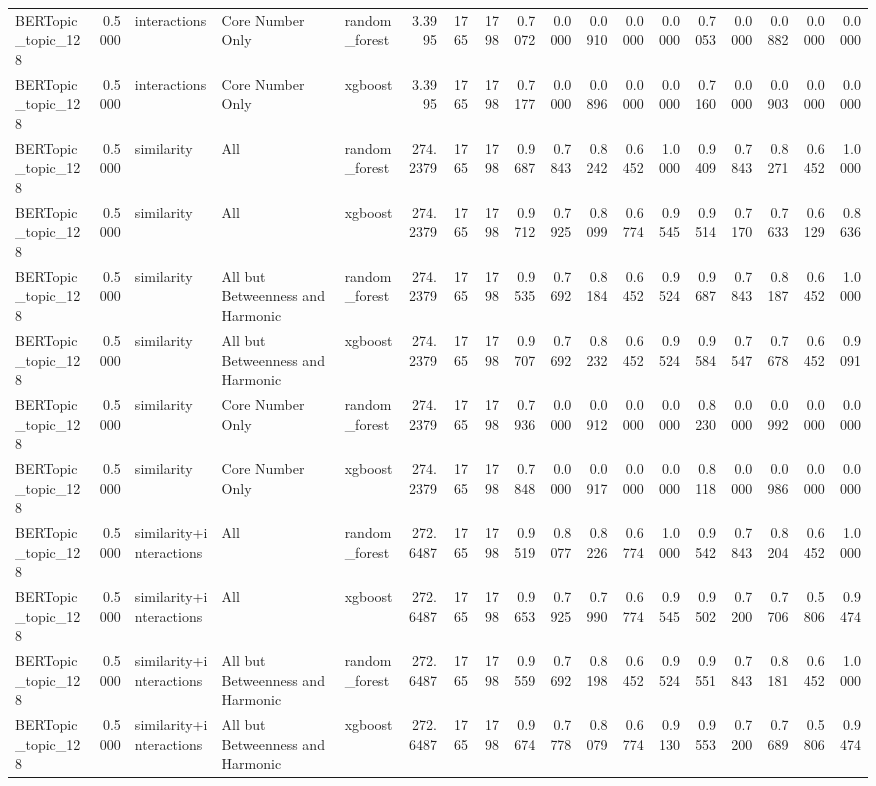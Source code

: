 \begin{tabular}{lrlllrrrrrrrrrrrrr}
BERTopic_topic_128 & 0.5000 & interactions & Core Number Only & random_forest & 3.3995 & 1765 & 1798 & 0.7072 & 0.0000 & 0.0910 & 0.0000 & 0.0000 & 0.7053 & 0.0000 & 0.0882 & 0.0000 & 0.0000 \\
BERTopic_topic_128 & 0.5000 & interactions & Core Number Only & xgboost & 3.3995 & 1765 & 1798 & 0.7177 & 0.0000 & 0.0896 & 0.0000 & 0.0000 & 0.7160 & 0.0000 & 0.0903 & 0.0000 & 0.0000 \\
BERTopic_topic_128 & 0.5000 & similarity & All & random_forest & 274.2379 & 1765 & 1798 & 0.9687 & 0.7843 & 0.8242 & 0.6452 & 1.0000 & 0.9409 & 0.7843 & 0.8271 & 0.6452 & 1.0000 \\
BERTopic_topic_128 & 0.5000 & similarity & All & xgboost & 274.2379 & 1765 & 1798 & 0.9712 & 0.7925 & 0.8099 & 0.6774 & 0.9545 & 0.9514 & 0.7170 & 0.7633 & 0.6129 & 0.8636 \\
BERTopic_topic_128 & 0.5000 & similarity & All but Betweenness and Harmonic & random_forest & 274.2379 & 1765 & 1798 & 0.9535 & 0.7692 & 0.8184 & 0.6452 & 0.9524 & 0.9687 & 0.7843 & 0.8187 & 0.6452 & 1.0000 \\
BERTopic_topic_128 & 0.5000 & similarity & All but Betweenness and Harmonic & xgboost & 274.2379 & 1765 & 1798 & 0.9707 & 0.7692 & 0.8232 & 0.6452 & 0.9524 & 0.9584 & 0.7547 & 0.7678 & 0.6452 & 0.9091 \\
BERTopic_topic_128 & 0.5000 & similarity & Core Number Only & random_forest & 274.2379 & 1765 & 1798 & 0.7936 & 0.0000 & 0.0912 & 0.0000 & 0.0000 & 0.8230 & 0.0000 & 0.0992 & 0.0000 & 0.0000 \\
BERTopic_topic_128 & 0.5000 & similarity & Core Number Only & xgboost & 274.2379 & 1765 & 1798 & 0.7848 & 0.0000 & 0.0917 & 0.0000 & 0.0000 & 0.8118 & 0.0000 & 0.0986 & 0.0000 & 0.0000 \\
BERTopic_topic_128 & 0.5000 & similarity+interactions & All & random_forest & 272.6487 & 1765 & 1798 & 0.9519 & 0.8077 & 0.8226 & 0.6774 & 1.0000 & 0.9542 & 0.7843 & 0.8204 & 0.6452 & 1.0000 \\
BERTopic_topic_128 & 0.5000 & similarity+interactions & All & xgboost & 272.6487 & 1765 & 1798 & 0.9653 & 0.7925 & 0.7990 & 0.6774 & 0.9545 & 0.9502 & 0.7200 & 0.7706 & 0.5806 & 0.9474 \\
BERTopic_topic_128 & 0.5000 & similarity+interactions & All but Betweenness and Harmonic & random_forest & 272.6487 & 1765 & 1798 & 0.9559 & 0.7692 & 0.8198 & 0.6452 & 0.9524 & 0.9551 & 0.7843 & 0.8181 & 0.6452 & 1.0000 \\
BERTopic_topic_128 & 0.5000 & similarity+interactions & All but Betweenness and Harmonic & xgboost & 272.6487 & 1765 & 1798 & 0.9674 & 0.7778 & 0.8079 & 0.6774 & 0.9130 & 0.9553 & 0.7200 & 0.7689 & 0.5806 & 0.9474 \\

\end{tabular}
